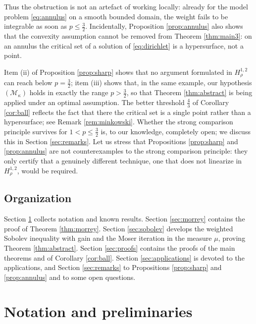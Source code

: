 \documentclass[reqno]{amsart}
\theoremstyle{plain}
\theoremstyle{definition}
\theoremstyle{remark}
\begin{document}
Thus the obstruction is not an artefact of working locally: already for the model problem
\eqref{eq:annulus} on a smooth bounded domain, the weight fails to be integrable as soon as
$p\le\frac32$. Incidentally, Proposition \ref{prop:annulus} also shows that the convexity assumption
cannot be removed from Theorem \ref{thm:main3}: on an annulus the critical set of a solution of
\eqref{eq:dirichlet} is a hypersurface, not a point.

Item (ii) of Proposition \ref{prop:sharp} shows that no argument formulated in $H^{1,2}_{\rho}$ can
reach below $p=\frac32$; item
(iii) shows that, in the same example, our hypothesis $(\mathcal M_\kappa)$ holds in exactly the
range $p>\frac32$, so that Theorem \ref{thm:abstract} is being applied under an optimal assumption.
The better threshold $\frac43$ of Corollary \ref{cor:ball} reflects the fact that there the critical
set is a single point rather than a hypersurface; see Remark \ref{rem:minkowski}. Whether the strong
comparison principle survives for $1<p\le\frac32$ is, to our knowledge, completely open; we discuss
this in Section \ref{sec:remarks}. Let us stress that Propositions \ref{prop:sharp} and
\ref{prop:annulus} are not counterexamples to the strong comparison principle: they only certify
that a genuinely different technique, one that does not linearize in $H^{1,2}_{\rho}$, would
be required.

\subsection{Organization} Section \ref{sec:prelim} collects notation and known results. Section
\ref{sec:morrey} contains the proof of Theorem \ref{thm:morrey}. Section \ref{sec:sobolev} develops
the weighted Sobolev inequality with gain and the Moser iteration in the measure $\mu$, proving
Theorem \ref{thm:abstract}. Section \ref{sec:proofs} contains the proofs of the main theorems and of
Corollary \ref{cor:ball}. Section \ref{sec:applications} is devoted to the applications, and
Section \ref{sec:remarks} to Propositions \ref{prop:sharp} and \ref{prop:annulus} and to some open
questions.

\section{Notation and preliminaries}\label{sec:prelim}
\end{document}
